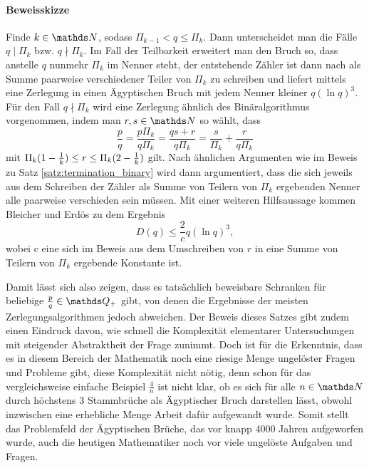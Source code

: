 \paragraph{Beweisskizze}Finde $k \in \N$, sodass $\Pi_{k-1} < q \leq \Pi_{k}$. Dann unterscheidet man die Fälle ${q \mid \Pi_k}$ bzw. $q \nmid \Pi_k$. Im Fall der Teilbarkeit erweitert man den Bruch so, dass anstelle $q$ nunmehr $\Pi_k$ im Nenner steht, der entstehende Zähler ist dann nach \cite[Lemma 1]{BleicherErdoes1976} als Summe paarweise verschiedener Teiler von $\Pi_k$ zu schreiben und liefert mittels \cite[Lemma 4]{BleicherErdoes1976} eine Zerlegung in einen Ägyptischen Bruch mit jedem Nenner kleiner $q(\ln q)^3$. Für den Fall ${q \nmid \Pi_k}$ wird eine Zerlegung ähnlich des Binäralgorithmus vorgenommen, indem man $r, s \in \N$ so wählt, dass
$$\frac{p}{q} = \frac{p \Pi_k}{q \Pi_k} = \frac{qs+r}{q \Pi_k} = \frac{s}{\Pi_k} + \frac{r}{q\Pi_k}$$
mit $\Pi_k(1-\frac{1}{k}) \leq r \leq \Pi_k(2-\frac{1}{k})$ gilt. Nach ähnlichen Argumenten wie im Beweis zu Satz \ref{satz:termination_binary} wird dann argumentiert, dass die sich jeweils aus dem Schreiben der Zähler als Summe von Teilern von $\Pi_k$ ergebenden Nenner alle paarweise verschieden sein müssen. Mit einer weiteren Hilfsaussage kommen Bleicher und Erdös zu dem Ergebnis
$$D(q) \leq \frac{2}{c}q(\ln q)^3,$$
wobei c eine sich im Beweis aus dem Umschreiben von $r$ in eine Summe von Teilern von $\Pi_k$ ergebende Konstante ist. \cite[S.162-163]{BleicherErdoes1976}

Damit lässt sich also zeigen, dass es tatsächlich beweisbare Schranken für beliebige ${\frac{p}{q} \in \Q_+}$ gibt, von denen die Ergebnisse der meisten Zerlegungsalgorithmen jedoch abweichen. Der Beweis dieses Satzes gibt zudem einen Eindruck davon, wie schnell die Komplexität elementarer Untersuchungen mit steigender Abstraktheit der Frage zunimmt. Doch ist für die Erkenntnis, dass es in diesem Bereich der Mathematik noch eine riesige Menge ungelöster Fragen und Probleme gibt, diese Komplexität nicht nötig, denn schon für das vergleichsweise einfache Beispiel $\frac{4}{n}$ ist nicht klar, ob es sich für alle $n \in \N$ durch höchstens 3 Stammbrüche als Ägyptischer Bruch darstellen lässt, obwohl inzwischen eine erhebliche Menge Arbeit dafür aufgewandt wurde. Somit stellt das Problemfeld der Ägyptischen Brüche, das vor knapp 4000 Jahren aufgeworfen wurde, auch die heutigen Mathematiker noch vor viele ungelöste Aufgaben und Fragen.